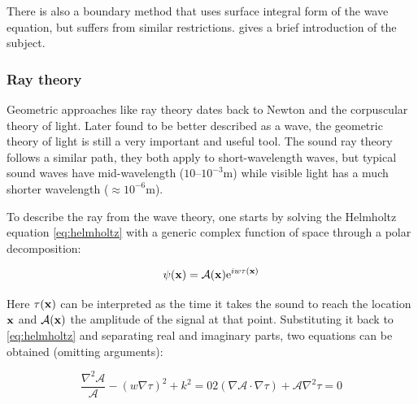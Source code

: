 There is also a boundary method that uses surface integral form of the wave
equation, but suffers from similar restrictions. \citet{funkhouser2003survey}
gives a brief introduction of the subject.

\subsubsection{Ray theory}
\label{sss:raytheory}

Geometric approaches like ray theory dates back to Newton and the corpuscular
theory of light. Later found to be better described as a wave, the geometric
theory of light is still a very important and useful tool. The sound ray theory
follows a similar path, they both apply to short-wavelength waves, but typical
sound waves have mid-wavelength ($10$--$10^{-3}$m) while visible light has a
much shorter wavelength ($\approx10^{-6}$m).

To describe the ray from the wave theory, one starts by solving the Helmholtz
equation \ref{eq:helmholtz} with a generic complex function of space
through a polar decomposition\cite{buckingham1992ocean,torres2007modeling}:

\begin{equation}
\label{eq:psi}
\psi(\mathrm{\mathbf{x}}) = \mathcal{A}(\mathrm{\mathbf{x}})\mathrm{e}^{iw\tau(\mathrm{\mathbf{x}})}
\end{equation}


Here $\tau(\mathrm{\mathbf{x}})$ can be interpreted as the time it takes the sound to
reach the location $\mathrm{\mathbf{x}}$ and $\mathcal{A}(\mathrm{\mathbf{x}})$ the amplitude of the
signal at that point. Substituting it back to \ref{eq:helmholtz} and
separating real and imaginary parts, two equations can be obtained (omitting
arguments):

\begin{subequations}
\begin{equation}
\label{eq:preeikonal}
\frac{\nabla^2\mathcal{A}}{\mathcal{A}} - (w\nabla \tau)^2 + k^2 = 0
\end{equation}

\begin{equation}
\label{eq:preeikonalamp}
2(\nabla\mathcal{A} \cdot \nabla \tau) + \mathcal{A}\nabla^2 \tau = 0
\end{equation}
\end{subequations}

